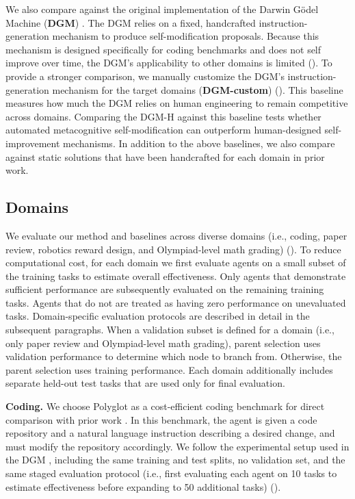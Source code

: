 \documentclass[]{fairmeta}
\begin{document}
We also compare against the original implementation of the Darwin G\"odel Machine (\textbf{DGM}) \citep{zhang2025darwin}. The DGM relies on a fixed, handcrafted instruction-generation mechanism to produce self-modification proposals. Because this mechanism is designed specifically for coding benchmarks and does not self improve over time, the DGM's applicability to other domains is limited ().
To provide a stronger comparison, we manually customize the DGM's instruction-generation mechanism for the target domains (\textbf{DGM-custom}) (). This baseline measures how much the DGM relies on human engineering to remain competitive across domains. Comparing the DGM-H against this baseline tests whether automated metacognitive self-modification can outperform human-designed self-improvement mechanisms.
In addition to the above baselines, we also compare against static solutions that have been handcrafted for each domain in prior work.

\subsection{Domains}
\label{sec:domains}

We evaluate our method and baselines across diverse domains (i.e., coding, paper review, robotics reward design, and Olympiad-level math grading) (). To reduce computational cost, for each domain we first evaluate agents on a small subset of the training tasks to estimate overall effectiveness. Only agents that demonstrate sufficient performance are subsequently evaluated on the remaining training tasks. Agents that do not are treated as having zero performance on unevaluated tasks. Domain-specific evaluation protocols are described in detail in the subsequent paragraphs. When a validation subset is defined for a domain (i.e., only paper review and Olympiad-level math grading), parent selection uses validation performance to determine which node to branch from. Otherwise, the parent selection uses training performance. Each domain additionally includes separate held-out test tasks that are used only for final evaluation.

\textbf{Coding.}
We choose Polyglot \citep{gauthier2024polyglot} as a cost-efficient coding benchmark for direct comparison with prior work \citep{zhang2025darwin}. In this benchmark, the agent is given a code repository and a natural language instruction describing a desired change, and must modify the repository accordingly. We follow the experimental setup used in the DGM \citep{zhang2025darwin}, including the same training and test splits, no validation set, and the same staged evaluation protocol (i.e., first evaluating each agent on 10 tasks to estimate effectiveness before expanding to 50 additional tasks) ().
\end{document}
